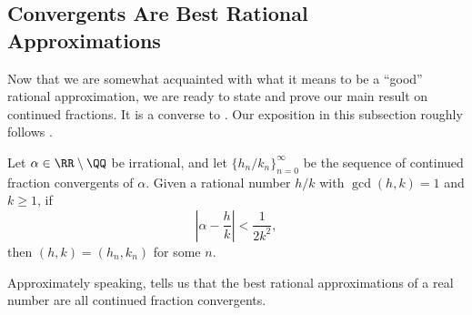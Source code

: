 \documentclass[../notes.tex]{subfiles}
\begin{document}
\subsection{Convergents Are Best Rational Approximations}
Now that we are somewhat acquainted with what it means to be a ``good'' rational approximation, we are ready to state and prove our main result on continued fractions. It is a converse to . Our exposition in this subsection roughly follows \cite[Theorem~184]{hardy-wright}.
\begin{theorem} \label{thm:cf-bound}
	Let $\alpha\in\RR\setminus\QQ$ be irrational, and let $\{h_n/k_n\}_{n=0}^\infty$ be the sequence of continued fraction convergents of $\alpha$. Given a rational number $h/k$ with $\gcd(h,k)=1$ and $k\ge1$, if
	\[\left|\alpha-\frac hk\right|<\frac1{2k^2},\]
	then $(h,k)=(h_n,k_n)$ for some $n$.
\end{theorem}
Approximately speaking,  tells us that the best rational approximations of a real number are all continued fraction convergents.
\end{document}
